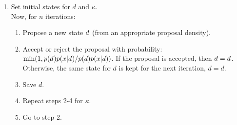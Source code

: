 \documentclass[
]{article}
\providecommand{\tightlist}{%
  \setlength{\itemsep}{0pt}\setlength{\parskip}{0pt}}
\begin{document}
\begin{enumerate}
\def\labelenumi{\arabic{enumi}.}
\tightlist
\item
  Set initial states for \(d\) and \(\kappa\).\\
  Now, for \(n\) iterations:

  \begin{enumerate}
  \def\labelenumii{\arabic{enumii}.}
  \setcounter{enumii}{1}
  \tightlist
  \item
    Propose a new state \(d^{\*}\) (from an appropriate proposal
    density).\\
  \item
    Accept or reject the proposal with probability:
    \(\mathrm{min}(1,p(d^{\*})p(x|d^{\*})/p(d)p(x|d))\). If the proposal
    is accepted, then \(d=d^{\*}\). Otherwise, the same state for \(d\)
    is kept for the next iteration, \(d=d\).\\
  \item
    Save \(d\).\\
  \item
    Repeat steps 2-4 for \(\kappa\).\\
  \item
    Go to step 2.
  \end{enumerate}
\end{enumerate}
\end{document}
